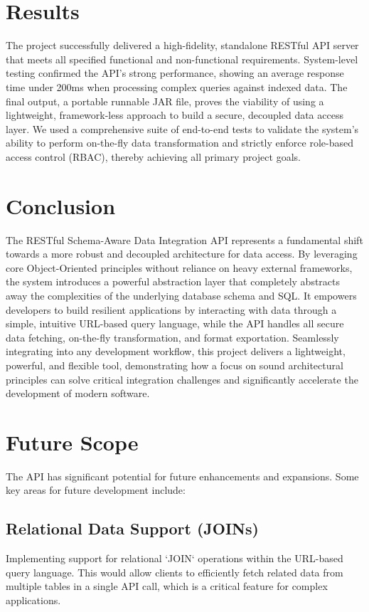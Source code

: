 \documentclass[12pt, a4paper]{report}
\begin{document}
\chapter{Results}
The project successfully delivered a high-fidelity, standalone RESTful API server that meets all specified functional and non-functional requirements. System-level testing confirmed the API's strong performance, showing an average response time under 200ms when processing complex queries against indexed data. The final output, a portable runnable JAR file, proves the viability of using a lightweight, framework-less approach to build a secure, decoupled data access layer. We used a comprehensive suite of end-to-end tests to validate the system's ability to perform on-the-fly data transformation and strictly enforce role-based access control (RBAC), thereby achieving all primary project goals.

\chapter{Conclusion}
The RESTful Schema-Aware Data Integration API represents a fundamental shift towards a more robust and decoupled architecture for data access. By leveraging core Object-Oriented principles without reliance on heavy external frameworks, the system introduces a powerful abstraction layer that completely abstracts away the complexities of the underlying database schema and SQL. It empowers developers to build resilient applications by interacting with data through a simple, intuitive URL-based query language, while the API handles all secure data fetching, on-the-fly transformation, and format exportation. Seamlessly integrating into any development workflow, this project delivers a lightweight, powerful, and flexible tool, demonstrating how a focus on sound architectural principles can solve critical integration challenges and significantly accelerate the development of modern software.

\chapter{Future Scope}
The API has significant potential for future enhancements and expansions. Some key areas for future development include:

\section{Relational Data Support (JOINs)}
Implementing support for relational `JOIN` operations within the URL-based query language. This would allow clients to efficiently fetch related data from multiple tables in a single API call, which is a critical feature for complex applications.
\end{document}
